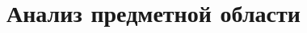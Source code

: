 \chapter{Анализ предметной области}

\begin{comment}
С ростом числа запросов к системе, встает вопрос о ее масштабировании.
Масштабирование — это процесс роста системы со временем, для эффективной
обработки все большего и большего количества запросов в единицу времени \cite{mashtab}.
Выделяют два вида масштабирования: горизонтальное и вертикальное \cite{com_analysis,mashtabtypes1,mashtabtypes2}. Вертикальное масштабирование происходит за счет увеличения мощности
вычислительного узла. Однако, использования только такого подхода часто
не хватает, поскольку постоянно увеличивая мощность, однажды будет до-
стигнут «потолок» производительности и дальнейшие аппаратные улучшения
будут недоступны. В таком случае для дальнейшего роста производительности
применяют горизонтальное масштабирование, которое заключается в добавле-
нии новых вычислительных узлов, выполняющих одинаковые функции. Для
расширения возможностей горизонтального масштабирования используются
балансировщики нагрузки \cite{mashtabtypes1,mashtabtypes2}.


Балансировка нагрузки --- это механизм приблизительного выравнивания рабочей нагрузки между всеми узлами распределенной системы \cite{anal}.
Это позволяет ускорить обслуживание заданий, например, свести к минимуму время отклика и повысить эффективность использования ресурсов.
\begin{comment}
	
Некоторые из основных целей алгоритма балансировки нагрузки, как указано в, заключаются в следующем: добиться большего общего улучшения производительности системы при разумных затратах, например, сократить время отклика задачи при сохранении приемлемых задержек; одинаково относиться ко всем заданиям в системе независимо от их происхождения; обладать отказоустойчивостью:
выносливостью производительности при частичном сбое в системе; иметь возможность модифицировать себя в соответствии с любыми изменениями или расширяться в конфигурации распределенной системы; и поддерживать стабильность системы: способность учитывать чрезвычайные ситуации, такие как внезапный всплеск поступлений, чтобы производительность системы не ухудшалась сверх определенного порога, одновременно предотвращая, чтобы узлы распределенной системы тратили слишком много времени на передачу заданий между собой вместо выполнения эти рабочие места. \cite{4}	


\end{comment}
